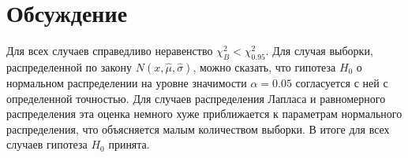 \documentclass[12pt,a4paper]{article}
\begin{document}
\section{Обсуждение}
Для всех случаев справедливо неравенство $\chi^2_B<\chi^2_{0.95}$. Для случая выборки, распределенной по закону $N(x,\hat{\mu},\hat{\sigma})$, можно сказать, что гипотеза $H_0$ о нормальном распределении на уровне значимости $\alpha=0.05$ согласуется с ней с определенной точностью. Для случаев распределения Лапласа и равномерного распределения эта оценка немного хуже приближается к параметрам нормального распределения, что объясняется малым количеством выборки. В итоге для всех случаев гипотеза $H_0$ принята.
\end{document}
